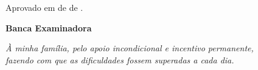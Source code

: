\documentclass[
    12pt,               %
    openright,          %
    oneside,            %
    a4paper,            %
    english,            %
    brazil              %
]{abntex2}
\begin{document}
\frenchspacing %


\imprimircapa

\imprimirfolhaderosto

\begin{folhadeaprovacao}
  \begin{center}
    {\ABNTEXchapterfont\large\imprimirautor}
    \vspace*{\fill}

    {\ABNTEXchapterfont\bfseries\Large\imprimirtitulo}
    \abntex@ifnotempty{\imprimirsubtitulo}{: \imprimirsubtitulo}
    \vspace*{\fill}

    \hspace{.45\textwidth}
    \begin{minipage}{.5\textwidth}
        \SingleSpacing
        \imprimirpreambulo
    \end{minipage}%
    \vspace*{\fill}

    Aprovado em \underline{\hspace{1cm}} de \underline{\hspace{3cm}} de \underline{\hspace{1.5cm}}.
    
    \vspace*{1.0cm}
    \textbf{Banca Examinadora}

    
    \vspace*{\fill}
    {\large\imprimirlocal}
    \par
    {\large\imprimirdata}
  \end{center}
\end{folhadeaprovacao}

\begin{dedicatoria}
   \vspace*{\fill}
   \centering
   \noindent
   \textit{À minha família, pelo apoio incondicional e incentivo permanente,\\
   fazendo com que as dificuldades fossem superadas a cada dia.} \vspace*{\fill}
\end{dedicatoria}
\end{document}
